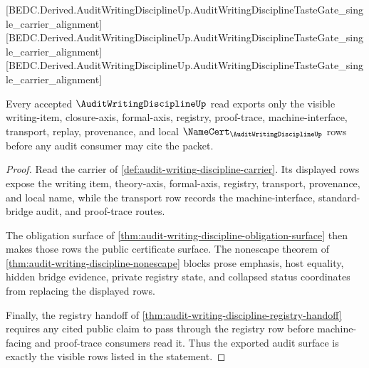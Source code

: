 [BEDC.Derived.AuditWritingDisciplineUp.AuditWritingDisciplineTasteGate\_single\_carrier\_alignment]
[BEDC.Derived.AuditWritingDisciplineUp.AuditWritingDisciplineTasteGate\_single\_carrier\_alignment]
[BEDC.Derived.AuditWritingDisciplineUp.AuditWritingDisciplineTasteGate\_single\_carrier\_alignment]

\begin{theorem}
\label{thm:audit-writing-discipline-public-export}
Every accepted $\AuditWritingDisciplineUp$ read exports only the visible writing-item, closure-axis, formal-axis, registry, proof-trace, machine-interface, transport, replay, provenance, and local $\NameCert_{\AuditWritingDisciplineUp}$ rows before any audit consumer may cite the packet.
\end{theorem}
\begin{proof}
Read the carrier of \autoref{def:audit-writing-discipline-carrier}. Its displayed rows expose the writing item, theory-axis, formal-axis, registry, transport, provenance, and local name, while the transport row records the machine-interface, standard-bridge audit, and proof-trace routes.

The obligation surface of \autoref{thm:audit-writing-discipline-obligation-surface} then makes those rows the public certificate surface. The nonescape theorem of \autoref{thm:audit-writing-discipline-nonescape} blocks prose emphasis, host equality, hidden bridge evidence, private registry state, and collapsed status coordinates from replacing the displayed rows.

Finally, the registry handoff of \autoref{thm:audit-writing-discipline-registry-handoff} requires any cited public claim to pass through the registry row before machine-facing and proof-trace consumers read it. Thus the exported audit surface is exactly the visible rows listed in the statement.
\end{proof}

